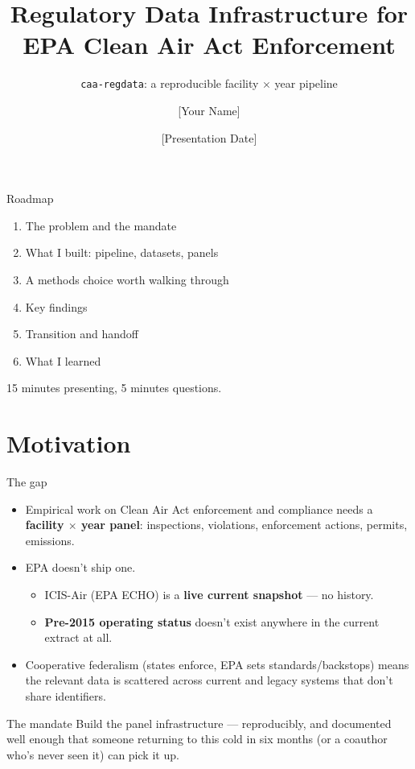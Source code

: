 \documentclass[aspectratio=169,11pt]{beamer}
\title{Regulatory Data Infrastructure for EPA Clean Air Act Enforcement}
\subtitle{\texttt{caa-regdata}: a reproducible facility $\times$ year pipeline}
\author{[Your Name]}
\institute{[Lab / Program Name] \\ 10-Week Internship, Final Presentation}
\date{[Presentation Date]}
\begin{document}
\begin{frame}[plain]
  \titlepage
\end{frame}

\begin{frame}{Roadmap}
  \begin{enumerate}
    \item The problem and the mandate
    \item What I built: pipeline, datasets, panels
    \item A methods choice worth walking through
    \item Key findings
    \item Transition and handoff
    \item What I learned
  \end{enumerate}
  \vfill
  \small\color{subtle} 15 minutes presenting, 5 minutes questions.
\end{frame}

\section{Motivation}
\begin{frame}{The gap}
  \begin{itemize}
    \item Empirical work on Clean Air Act enforcement and compliance needs a \textbf{facility $\times$ year
      panel}: inspections, violations, enforcement actions, permits, emissions.
    \item EPA doesn't ship one.
    \begin{itemize}
      \item ICIS-Air (EPA ECHO) is a \textbf{live current snapshot} — no history.
      \item \textbf{Pre-2015 operating status} doesn't exist anywhere in the current extract at all.
    \end{itemize}
    \item Cooperative federalism (states enforce, EPA sets standards/backstops) means the relevant data is
      scattered across current and legacy systems that don't share identifiers.
  \end{itemize}
  \begin{block}{The mandate}
    Build the panel infrastructure — reproducibly, and documented well enough that someone returning to
    this cold in six months (or a coauthor who's never seen it) can pick it up.
  \end{block}
\end{frame}
\end{document}
